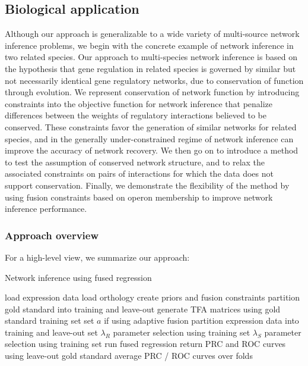 \documentclass[11pt]{article}
\begin{document}
\subsection{Biological application}
Although our approach is generalizable to a wide variety of multi-source network inference problems, we begin with the concrete example of network inference in two related species. 
Our approach to multi-species network inference is based on the hypothesis that gene regulation in related species is governed by similar but not necessarily identical gene regulatory networks, due to conservation of function through evolution. 
We represent conservation of network function by introducing constraints into the objective function for network inference that penalize differences between the weights of regulatory interactions believed to be conserved. 
These constraints favor the generation of similar networks for related species, and in the generally under-constrained regime of network inference can improve the accuracy of network recovery. 
We then go on to introduce a method to test the assumption of conserved network structure, and to relax the associated constraints on pairs of interactions for which the data does not support conservation. Finally, we demonstrate the flexibility of the method by using fusion constraints based on operon membership to improve network inference performance. 


\subsubsection{Approach overview}
For a high-level view, we summarize our approach:

\begin{algorithm}
	\caption{Network inference using fused regression}\label{euclid}
	\begin{algorithmic}
\State load expression data
\State load orthology
\State create priors and fusion constraints
\State partition gold standard into training and leave-out
\State generate TFA matrices using gold standard training set
\State set $a$ if using adaptive fusion
	\State partition expression data into training and leave-out set
	\State $\lambda_R$ parameter selection using training set
	\State $\lambda_S$ parameter selection using training set
	\State run fused regression
	\State return PRC and ROC curves using leave-out gold standard
	\EndFor
\State average PRC / ROC curves over folds
\EndProcedure
\end{algorithmic}
\end{algorithm}
\end{document}
